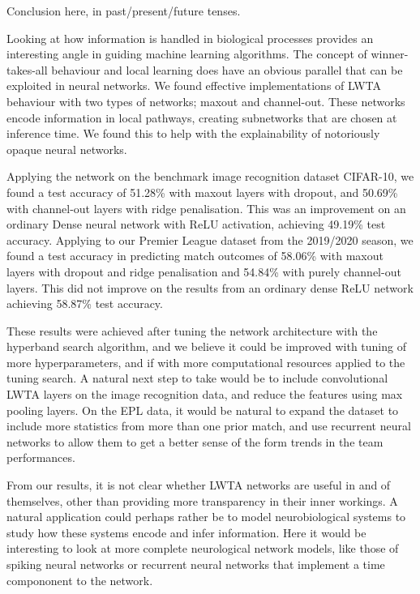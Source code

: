 Conclusion here, in past/present/future tenses.

Looking at how information is handled in biological processes provides an interesting angle in guiding machine learning algorithms. The concept of winner-takes-all behaviour and local learning does have an obvious parallel that can be exploited in neural networks. We found effective implementations of LWTA behaviour with two types of networks; maxout and channel-out. These networks encode information in local pathways, creating subnetworks that are chosen at inference time. We found this to help with the explainability of notoriously opaque neural networks.

Applying the network on the benchmark image recognition dataset CIFAR-10, we found a test accuracy of 51.28\% with maxout layers with dropout, and 50.69\% with channel-out layers with ridge penalisation. This was an improvement on an ordinary Dense neural network with ReLU activation, achieving 49.19\% test accuracy. Applying to our Premier League dataset from the 2019/2020 season, we found a test accuracy in predicting match outcomes of 58.06\% with maxout layers with dropout and ridge penalisation and 54.84\% with purely channel-out layers. This did not improve on the results from an ordinary dense ReLU network achieving 58.87\% test accuracy.

These results were achieved after tuning the network architecture with the hyperband search algorithm, and we believe it could be improved with tuning of more hyperparameters, and if with more computational resources applied to the tuning search. A natural next step to take would be to include convolutional LWTA layers on the image recognition data, and reduce the features using max pooling layers. On the EPL data, it would be natural to expand the dataset to include more statistics from more than one prior match, and use recurrent neural networks to allow them to get a better sense of the form trends in the team performances.

From our results, it is not clear whether LWTA networks are useful in and of themselves, other than providing more transparency in their inner workings. A natural application could perhaps rather be to model neurobiological systems to study how these systems encode and infer information. Here it would be interesting to look at more complete neurological network models, like those of spiking neural networks or recurrent neural networks that implement a time compononent to the network. 




